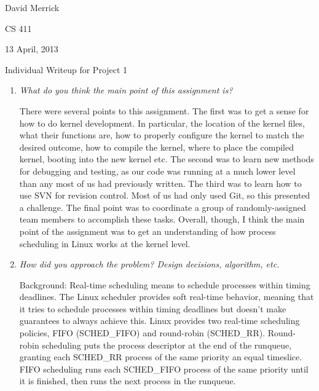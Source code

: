 \documentclass[letterpaper,10pt,titlepage]{article}
\newcommand{\ignore}[2]{\hspace{0in}#2} %
\newcommand{\tab}{\hspace*{2em}} %
\def\name{David Merrick}
\begin{document}
\name

CS 411

13 April, 2013

\begin{center}
{\LARGE Individual Writeup for Project 1}
\end{center}

\begin{enumerate} 
\item \emph{What do you think the main point of this assignment is?}

\tab There were several points to this assignment. The first was to get a sense for how to do kernel development. In particular, the location of the kernel files, what their functions are, how to properly configure the kernel to match the desired outcome, how to compile the kernel, where to place the compiled kernel, booting into the new kernel etc. The second was to learn new methods for debugging and testing, as our code was running at a much lower level than any most of us had previously written. The third was to learn how to use SVN for revision control. Most of us had only used Git, so this presented a challenge. The final point was to coordinate a group of randomly-assigned team members to accomplish these tasks. Overall, though, I think the main point of the assignment was to get an understanding of how process scheduling in Linux works at the kernel level.

\item \emph{How did you approach the problem? Design decisions, algorithm, etc.}

\tab Background: Real-time scheduling means to schedule processes within timing deadlines. The Linux scheduler provides soft real-time behavior, meaning that it tries to schedule processes within timing deadlines but doesn't make guarantees to always achieve this. Linux provides two real-time scheduling policies, FIFO (SCHED\_FIFO) and round-robin (SCHED\_RR)\ignore{[Source: Linux Kernel Development, pg. 64]}. Round-robin scheduling puts the process descriptor at the end of the runqueue, granting each SCHED\_RR process of the same priority an equal timeslice. FIFO scheduling runs each SCHED\_FIFO process of the same priority until it is finished, then runs the next process in the runqueue. \ignore{[Source: http://oreilly.com/catalog/linuxkernel/chapter/ch10.html]}


\end{enumerate}
\end{document}
